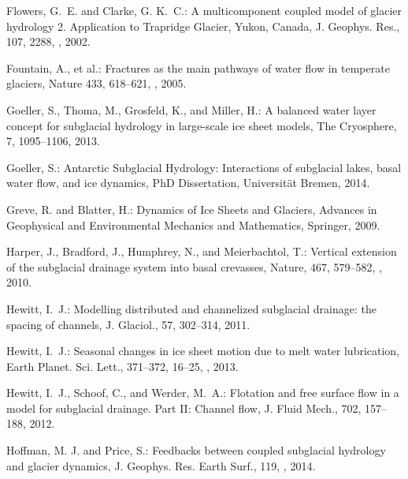 \documentclass[gmd]{copernicus}   %
\begin{document}
\begin{thebibliography}{}
Flowers, G.~E. and Clarke, G. K.~C.: A multicomponent coupled model of glacier
  hydrology 2. {A}pplication to {T}rapridge {G}lacier, {Y}ukon, {C}anada, J.
  Geophys. Res., 107, 2288, , 2002{}.

Fountain, A., et al.: Fractures as the main pathways of water flow in temperate glaciers, Nature 433, 618--621, , 2005.

Goeller, S., Thoma, M., Grosfeld, K., and Miller, H.: A balanced water layer
  concept for subglacial hydrology in large-scale ice sheet models, The
  Cryosphere, 7, 1095--1106, 2013.

Goeller, S.: Antarctic {S}ubglacial {H}ydrology: {I}nteractions of subglacial lakes, basal water flow, and ice dynamics, PhD Dissertation, Universit\"at Bremen, 2014.

Greve, R. and Blatter, H.: Dynamics of {I}ce {S}heets and {G}laciers, Advances
  in Geophysical and Environmental Mechanics and Mathematics, Springer, 2009.

Harper, J., Bradford, J., Humphrey, N., and Meierbachtol, T.: Vertical
  extension of the subglacial drainage system into basal crevasses, Nature,
  467, 579--582, , 2010.

Hewitt, I.~J.: Modelling distributed and channelized subglacial drainage: the
  spacing of channels, J. Glaciol., 57, 302--314, 2011.

Hewitt, I.~J.: Seasonal changes in ice sheet motion due to melt water
  lubrication, Earth Planet. Sci. Lett., 371--372, 16--25,
  , 2013.

Hewitt, I.~J., Schoof, C., and Werder, M.~A.: Flotation and free surface flow
  in a model for subglacial drainage. {P}art {II}: {C}hannel flow, J. Fluid
  Mech., 702, 157--188, 2012.

Hoffman, M. J. and Price, S.: Feedbacks between coupled subglacial hydrology and glacier dynamics, J. Geophys. Res. Earth Surf., 119, , 2014.


\end{thebibliography}
\end{document}
